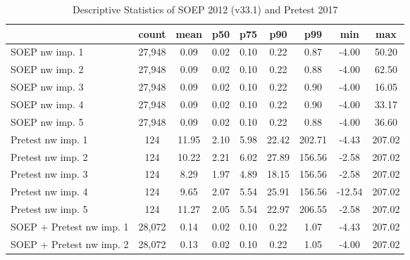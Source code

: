 \begin{table}[htbp]\centering
\def\sym#1{\ifmmode^{#1}\else\(^{#1}\)\fi}
\caption{Descriptive Statistics of SOEP 2012 (v33.1) and Pretest 2017}
\begin{tabular}{l*{1}{cccccccc}}
\hline\hline
                                            &       count&        mean&         p50&         p75&         p90&         p99&         min&         max\\
\hline
SOEP nw imp. 1                              &      27,948&        0.09&        0.02&        0.10&        0.22&        0.87&       -4.00&       50.20\\
SOEP nw imp. 2                              &      27,948&        0.09&        0.02&        0.10&        0.22&        0.88&       -4.00&       62.50\\
SOEP nw imp. 3                              &      27,948&        0.09&        0.02&        0.10&        0.22&        0.90&       -4.00&       16.05\\
SOEP nw imp. 4                              &      27,948&        0.09&        0.02&        0.10&        0.22&        0.90&       -4.00&       33.17\\
SOEP nw imp. 5                              &      27,948&        0.09&        0.02&        0.10&        0.22&        0.88&       -4.00&       36.60\\
Pretest nw imp. 1                           &         124&       11.95&        2.10&        5.98&       22.42&      202.71&       -4.43&      207.02\\
Pretest nw imp. 2                           &         124&       10.22&        2.21&        6.02&       27.89&      156.56&       -2.58&      207.02\\
Pretest nw imp. 3                           &         124&        8.29&        1.97&        4.89&       18.15&      156.56&       -2.58&      207.02\\
Pretest nw imp. 4                           &         124&        9.65&        2.07&        5.54&       25.91&      156.56&      -12.54&      207.02\\
Pretest nw imp. 5                           &         124&       11.27&        2.05&        5.54&       22.97&      206.55&       -2.58&      207.02\\
SOEP + Pretest nw imp. 1                    &      28,072&        0.14&        0.02&        0.10&        0.22&        1.07&       -4.43&      207.02\\
SOEP + Pretest nw imp. 2                    &      28,072&        0.13&        0.02&        0.10&        0.22&        1.05&       -4.00&      207.02\\

\end{tabular}
\end{table}
